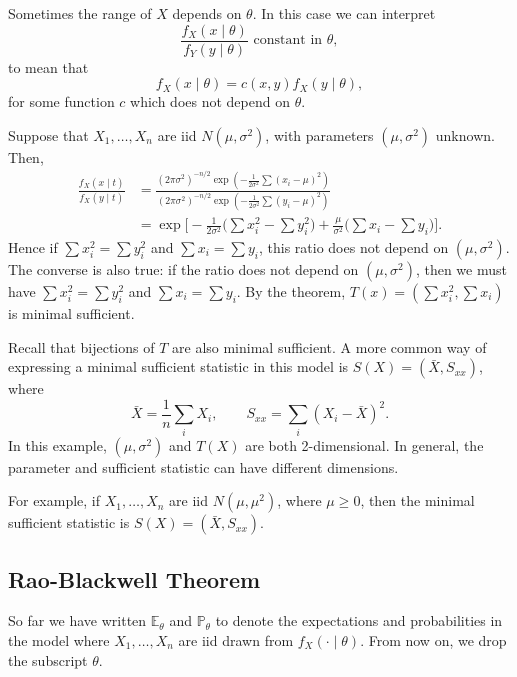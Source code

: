 \documentclass[12pt]{article}
\begin{document}
\begin{remark}
	Sometimes the range of $X$ depends on $\theta$. In this case we can interpret
	\[
		\frac{f_X(x \mid \theta)}{f_Y(y \mid \theta)} \text{ constant in } \theta
	,\]
	to mean that
	\[
	f_X(x \mid \theta) = c(x, y) f_X(y \mid \theta)
	,\]
	for some function $c$ which does not depend on $\theta$.
\end{remark}

\begin{exbox}
	Suppose that $X_1, \ldots, X_n$ are iid $N(\mu, \sigma^2)$, with parameters $(\mu, \sigma^2)$ unknown. Then,
	\begin{align*}
	\frac{f_X(x \mid t)}{f_X(y \mid t)} &= \frac{(2 \pi \sigma^2)^{-n/2} \exp (-\frac{1}{2 \sigma^2} \sum (x_i - \mu)^2)}{(2 \pi \sigma^2)^{-n/2} \exp (-\frac{1}{2 \sigma^2} \sum (y_i - \mu)^2)} \\
					    &= \exp \biggl[ - \frac{1}{2 \sigma^2} \biggl(\sum x_i^2 - \sum y_i^2\biggr) + \frac{\mu}{\sigma^2} \biggl(\sum x_i - \sum y_i\biggr) \biggr].
	\end{align*}
	Hence if $\sum x_i^2 = \sum y_i^2$ and $\sum x_i = \sum y_i$, this ratio does not depend on $(\mu, \sigma^2)$. The converse is also true: if the ratio does not depend on $(\mu, \sigma^2)$, then we must have $\sum x_i^2 = \sum y_i^2$ and $\sum x_i = \sum y_i$. By the theorem, $T(x) = (\sum x_i^2, \sum x_i)$ is minimal sufficient.

	Recall that bijections of $T$ are also minimal sufficient. A more common way of expressing a minimal sufficient statistic in this model is $S(X) = (\bar X, S_{x x})$, where
	\[
	\bar X = \frac{1}{n} \sum_{i} X_i, \qquad S_{x x} = \sum_{i} (X_i - \bar X)^2
	.\]
	In this example, $(\mu, \sigma^2)$ and $T(X)$ are both 2-dimensional. In general, the parameter and sufficient statistic can have different dimensions.

	For example, if $X_1, \ldots, X_n$ are iid $N(\mu, \mu^2)$, where $\mu \geq 0$, then the minimal sufficient statistic is $S(X) = (\bar X, S_{x x})$.
\end{exbox}

\subsection{Rao-Blackwell Theorem}
\label{sub:rao_blackwell_theorem}

So far we have written $\mathbb{E}_{\theta}$ and $\mathbb{P}_{\theta}$ to denote the expectations and probabilities in the model where $X_1, \ldots, X_n$ are iid drawn from $f_X(\cdot \mid \theta)$. From now on, we drop the subscript $\theta$.
\end{document}
